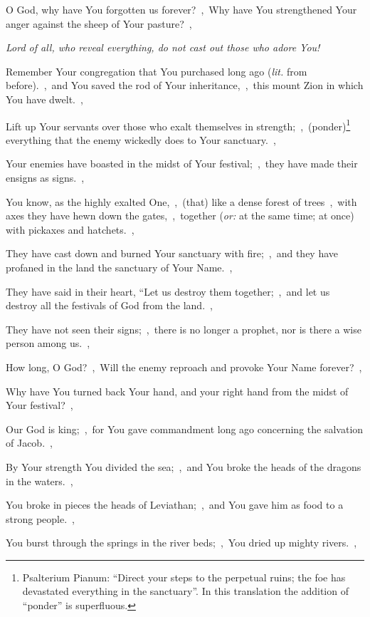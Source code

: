 \documentclass[12pt,twoside,a5paper]{article}
\newcommand{\qanona}[1]{{\liturgicalhint{Qanona.} \emph{#1}}}
\newcommand{\translationoption}[1]{\emph{or:} #1}
\newcommand{\translationliteral}[1]{\emph{lit.} #1}
\begin{document}
\begin{normalparskip}
  O God, why have You forgotten us forever?~\sep\ Why have You strengthened Your anger against the sheep of Your pasture?~\sep

  \qanona{Lord of all, who reveal everything, do not cast out those who adore You!}

  Remember Your congregation that You purchased long ago (\translationliteral{from before}).~\sep\ and You saved the rod of Your inheritance,~\sep\ this mount Zion in which You have dwelt.~\sep

  Lift up Your servants over those who exalt themselves in strength;~\sep\ (ponder)\footnote{Psalterium Pianum: ``Direct your steps to the perpetual ruins; the foe has devastated everything in the sanctuary''. In this translation the addition of ``ponder'' is superfluous.} everything that the enemy wickedly does to Your sanctuary.~\sep

  Your enemies have boasted in the midst of Your festival;~\sep\ they have made their ensigns as signs.~\sep

  You know, as the highly exalted One,~\sep\ (that) like a dense forest of trees~\sep\ with axes they have hewn down the gates,~\sep\ together (\translationoption{at the same time; at once}) with pickaxes and hatchets.~\sep

  They have cast down and burned Your sanctuary with fire;~\sep\ and they have profaned in the land the sanctuary of Your Name.~\sep

  They have said in their heart, ``Let us destroy them together;~\sep\ and let us destroy all the festivals of God from the land.~\sep

  They have not seen their signs;~\sep\ there is no longer a prophet, nor is there a wise person among us.~\sep

  How long, O God?~\sep\ Will the enemy reproach and provoke Your Name forever?~\sep

  Why have You turned back Your hand, and your right hand from the midst of Your festival?~\sep

  Our God is king;~\sep\ for You gave commandment long ago concerning the salvation of Jacob.~\sep

  By Your strength You divided the sea;~\sep\ and You broke the heads of the dragons in the waters.~\sep

  You broke in pieces the heads of Leviathan;~\sep\ and You gave him as food to a strong people.~\sep

  You burst through the springs in the river beds;~\sep\ You dried up mighty rivers.~\sep


\end{normalparskip}
\end{document}
